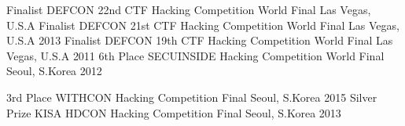 \begin{cvhonors}
  \cvhonor
    {Finalist}
    {DEFCON 22nd CTF Hacking Competition World Final}
    {Las Vegas, U.S.A}
    {}
  \cvhonor
    {Finalist}
    {DEFCON 21st CTF Hacking Competition World Final}
    {Las Vegas, U.S.A}
    {2013}
  \cvhonor
    {Finalist}
    {DEFCON 19th CTF Hacking Competition World Final}
    {Las Vegas, U.S.A}
    {2011}
  \cvhonor
    {6th Place}
    {SECUINSIDE Hacking Competition World Final}
    {Seoul, S.Korea}
    {2012}
\end{cvhonors}

\begin{cvhonors}
  \cvhonor
    {3rd Place}
    {WITHCON Hacking Competition Final}
    {Seoul, S.Korea}
    {2015}
  \cvhonor
    {Silver Prize}
    {KISA HDCON Hacking Competition Final}
    {Seoul, S.Korea}
    {2013}
\end{cvhonors}
